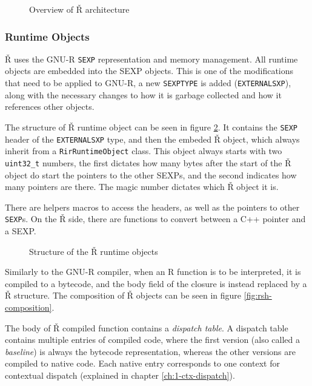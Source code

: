\begin{figure}
	\centering
	\caption{Overview of Ř architecture\cite{reusing-jit}}\label{fig:rsh-archit}
\end{figure}

\subsubsection*{Runtime Objects}
Ř uses the GNU-R \texttt{SEXP} representation and memory management. All runtime objects are embedded into the SEXP objects. This is one of the modifications that need to be applied to GNU-R, a new \texttt{SEXPTYPE} is added (\texttt{EXTERNALSXP}), along with the necessary changes to how it is garbage collected and how it references other objects.

The structure of Ř runtime object can be seen in figure \ref{fig:rsh-object-struct}. It contains the \texttt{SEXP} header of the \texttt{EXTERNALSXP} type, and then the embeded Ř object, which always inherit from a \texttt{RirRuntimeObject} class. This object always starts with two \texttt{uint32\_t} numbers, the first dictates how many bytes after the start of the Ř object do start the pointers to the other SEXPs, and the second indicates how many pointers are there. The magic number dictates which Ř object it is.

There are helpers macros to access the headers, as well as the pointers to other \texttt{SEXP}s. On the Ř side, there are functions to convert between a C++ pointer and a SEXP.

\begin{figure}
	\centering
	\begin{adjustbox}{trim=10 80pt 0 0, clip}
	\end{adjustbox}
	\caption{Structure of the Ř runtime objects}\label{fig:rsh-object-struct}
\end{figure}

Similarly to the GNU-R compiler, when an R function is to be interpreted, it is compiled to a bytecode, and the body field of the closure is instead replaced by a Ř structure. The composition of Ř objects can be seen in figure \ref{fig:rsh-composition}.

The body of Ř compiled function contains a \textit{dispatch table}. A dispatch table contains multiple entries of compiled code, where the first version (also called a \textit{baseline}) is always the bytecode representation, whereas the other versions are compiled to native code. Each native entry corresponds to one context for contextual dispatch (explained in chapter \ref{ch:1-ctx-dispatch}).

